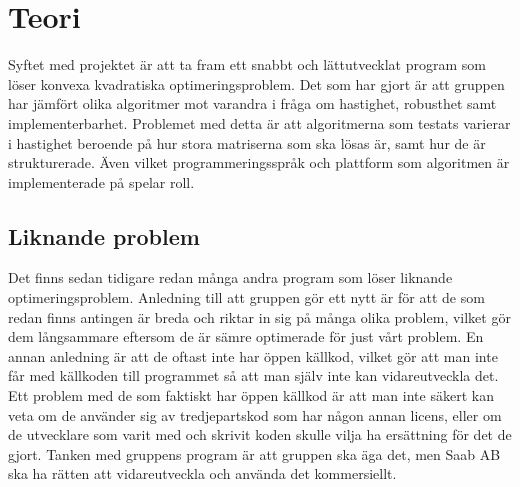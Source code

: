 \section{Teori}
Syftet med projektet är att ta fram ett snabbt och lättutvecklat program som löser konvexa kvadratiska optimeringsproblem. Det som har gjort är att gruppen har jämfört olika algoritmer mot varandra i fråga om hastighet, robusthet samt implementerbarhet. Problemet med detta är att algoritmerna som testats varierar i hastighet beroende på hur stora matriserna som ska lösas är, samt hur de är strukturerade. Även vilket programmeringsspråk och plattform som algoritmen är implementerade på spelar roll.

\subsection{Liknande problem}
Det finns sedan tidigare redan många andra program som löser liknande optimeringsproblem. Anledning till att gruppen gör ett nytt är för att de som redan finns antingen är breda och riktar in sig på många olika problem, vilket gör dem långsammare eftersom de är sämre optimerade för just vårt problem. En annan anledning är att de oftast inte har öppen källkod, vilket gör att man inte får med källkoden till programmet så att man själv inte kan vidareutveckla det. Ett problem med de som faktiskt har öppen källkod är att man inte säkert kan veta om de använder sig av tredjepartskod som har någon annan licens, eller om de utvecklare som varit med och skrivit koden skulle vilja ha ersättning för det de gjort.
Tanken med gruppens program är att gruppen ska äga det, men Saab AB ska ha rätten att vidareutveckla och använda det kommersiellt.

